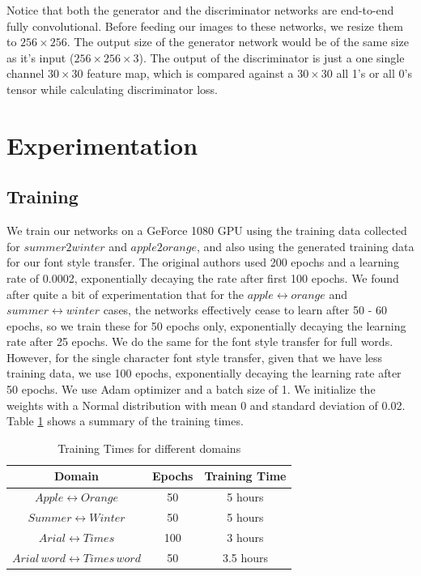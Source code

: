 \documentclass[10pt,twocolumn,letterpaper]{article}
\begin{document}
Notice that both the generator and the discriminator networks are end-to-end fully convolutional. Before 
feeding our images to these networks, we resize them to $256 \times 256$. The output size of the generator network would be of the same size as it's input ($256 \times 256 \times 3$). The output of the 
discriminator is just a one single channel $30 \times 30$ feature map, which is compared against a $30 \times 30$ all 1's or all 0's tensor while calculating discriminator loss.

\section{Experimentation}

\subsection{Training}
We train our networks on a GeForce 1080 GPU using the training data collected for $summer2winter$ and $apple2orange$, and also using the generated training data for our
font style transfer. The original authors \cite{cyclegan} used 200 epochs and a learning rate of 0.0002, exponentially decaying the rate after first 100 epochs. We found after 
quite a bit of experimentation that for the $apple \leftrightarrow orange$ and $summer \leftrightarrow winter$ cases, the networks effectively cease to learn after 50 - 60 epochs, so we train these for 50 epochs only, exponentially decaying the learning rate after 25 epochs. We do the same for the font style transfer for full words. However, for the single character font style transfer, given that we have less training data, we use 100 epochs, exponentially decaying the learning rate after 50 epochs. We use Adam optimizer and a batch size of 1. We initialize the weights with a Normal distribution with mean 0 and standard deviation of 0.02. Table \ref{table:train} shows a summary of the training times.

\begin{table}[ht!]  
\begin{center}
\begin{tabular}{ |c|c|c| } 
 \hline
 \textbf{Domain} & \textbf{Epochs} & \textbf{Training Time} \\ 
 \hline
 $Apple \leftrightarrow Orange$ & 50 & 5 hours \\ 
 \hline
 $Summer \leftrightarrow Winter$ & 50 & 5 hours \\ 
 \hline
 $Arial \leftrightarrow Times$ & 100 & 3 hours \\ 
 \hline
 $Arial \, word\leftrightarrow Times \, word$ & 50 & 3.5 hours \\ 
 \hline
\end{tabular}
\end{center}
\caption{Training Times for different domains}
\label{table:train}
\end{table}
\end{document}
